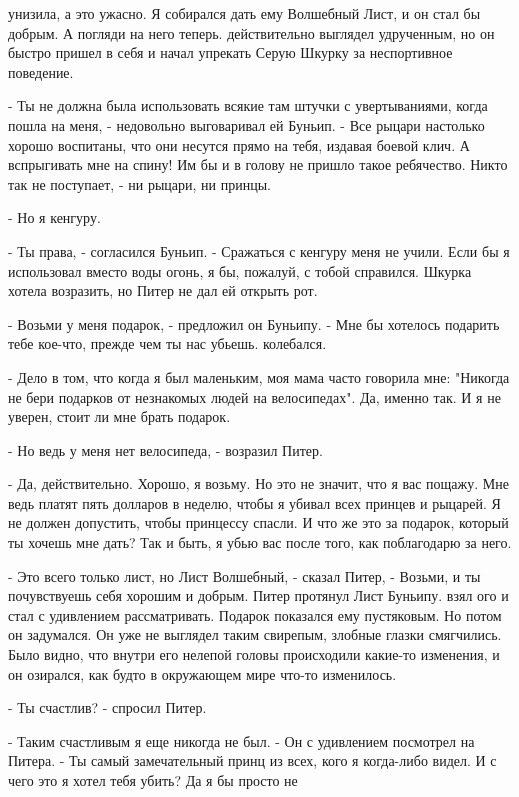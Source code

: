 унизила, а это ужасно. Я собирался дать ему Волшебный Лист, и он стал 
бы добрым. А погляди на него теперь.
 действительно выглядел удрученным, но он быстро пришел в 
себя и начал упрекать Серую Шкурку за неспортивное поведение.
\par- Ты не должна была использовать всякие там штучки с 
увертываниями, когда пошла на меня, - недовольно выговаривал ей 
Буньип. - Все рыцари настолько хорошо воспитаны, что они несутся прямо 
на тебя, издавая боевой клич. А вспрыгивать мне на спину! Им бы и в 
голову не пришло такое ребячество. Никто так не поступает, - ни 
рыцари, ни принцы.
\par- Но я кенгуру.
\par- Ты права, - согласился Буньип. - Сражаться с кенгуру меня не 
учили. Если бы я использовал вместо воды огонь, я бы, пожалуй, с тобой 
справился.
 Шкурка хотела возразить, но Питер не дал ей открыть рот.
\par- Возьми у меня подарок, - предложил он Буньипу. - Мне бы хотелось 
подарить тебе кое-что, прежде чем ты нас убьешь.
 колебался.
\par- Дело в том, что когда я был маленьким, моя мама часто говорила 
мне: "Никогда не бери подарков от незнакомых людей на велосипедах". 
Да, именно так. И я не уверен, стоит ли мне брать подарок.
\par- Но ведь у меня нет велосипеда, - возразил Питер.
\par- Да, действительно. Хорошо, я возьму. Но это не значит, что я вас 
пощажу. Мне ведь платят пять долларов в неделю, чтобы я убивал всех 
принцев и рыцарей. Я не должен допустить, чтобы принцессу спасли. И 
что же это за подарок, который ты хочешь мне дать? Так и быть, я убью 
вас после того, как поблагодарю за него.
\par- Это всего только лист, но Лист Волшебный, - сказал Питер, - 
Возьми, и ты почувствуешь себя хорошим и добрым.
 Питер протянул Лист Буньипу.
 взял ого и стал с удивлением рассматривать. Подарок показался 
ему пустяковым. Но потом он задумался. Он уже не выглядел таким 
свирепым, злобные глазки смягчились. Было видно, что внутри его 
нелепой головы происходили какие-то изменения, и он озирался, как 
будто в окружающем мире что-то изменилось.
\par- Ты счастлив? - спросил Питер.
\par- Таким счастливым я еще никогда не был. - Он с удивлением 
посмотрел на Питера. - Ты самый замечательный принц из всех, кого я 
когда-либо видел. И с чего это я хотел тебя убить? Да я бы просто не 

